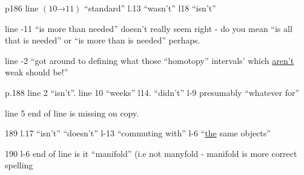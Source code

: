 p186 line $(10\mathord{\to}11)$ ``standard'' l.13 ``wasn't'' l18 ``isn't''

line -11 ``is more than needed'' doesn't really seem right - do you mean ``is all that is needed'' or ``is more than is needed'' perhaps.

line -2 ``got around to defining  what those ``homotopy'' intervals' which \uline{aren't} weak should be!''

p.188 line 2 ``isn't''. line 10 ``weeks'' l14. ``didn't'' l-9 presumably ``whatever for''

line 5  end of line is missing on copy.

189 l.17 ``isn't'' ``doesn't'' l-13 ``commuting with'' l-6 ``\uline{the} same objects''

190 l-6 end of line is it ``manifold'' (i.e not manyfold - manifold is  more correct spelling

